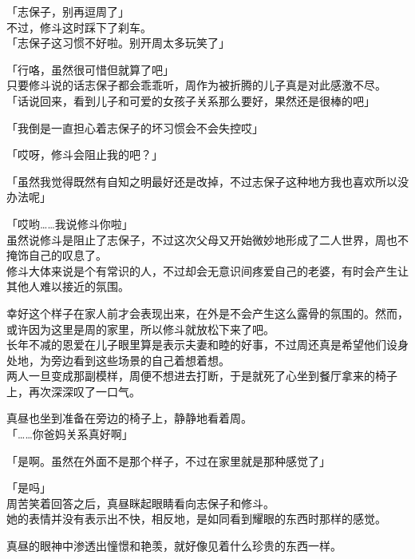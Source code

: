 「志保子，别再逗周了」\\

不过，修斗这时踩下了刹车。\\

「志保子这习惯不好啦。别开周太多玩笑了」

「行咯，虽然很可惜但就算了吧」\\

只要修斗说的话志保子都会乖乖听，周作为被折腾的儿子真是对此感激不尽。\\

「话说回来，看到儿子和可爱的女孩子关系那么要好，果然还是很棒的吧」

「我倒是一直担心着志保子的坏习惯会不会失控哎」

「哎呀，修斗会阻止我的吧？」

「虽然我觉得既然有自知之明最好还是改掉，不过志保子这种地方我也喜欢所以没办法呢」

「哎哟……我说修斗你啦」\\

虽然说修斗是阻止了志保子，不过这次父母又开始微妙地形成了二人世界，周也不掩饰自己的叹息了。\\

修斗大体来说是个有常识的人，不过却会无意识间疼爱自己的老婆，有时会产生让其他人难以接近的氛围。

幸好这个样子在家人前才会表现出来，在外是不会产生这么露骨的氛围的。然而，或许因为这里是周的家里，所以修斗就放松下来了吧。\\

长年不减的恩爱在儿子眼里算是表示夫妻和睦的好事，不过周还真是希望他们设身处地，为旁边看到这些场景的自己着想着想。\\

两人一旦变成那副模样，周便不想进去打断，于是就死了心坐到餐厅拿来的椅子上，再次深深叹了一口气。

真昼也坐到准备在旁边的椅子上，静静地看着周。\\

「……你爸妈关系真好啊」

「是啊。虽然在外面不是那个样子，不过在家里就是那种感觉了」

「是吗」\\

周苦笑着回答之后，真昼眯起眼睛看向志保子和修斗。\\

她的表情并没有表示出不快，相反地，是如同看到耀眼的东西时那样的感觉。

真昼的眼神中渗透出憧憬和艳羡，就好像见着什么珍贵的东西一样。\\

